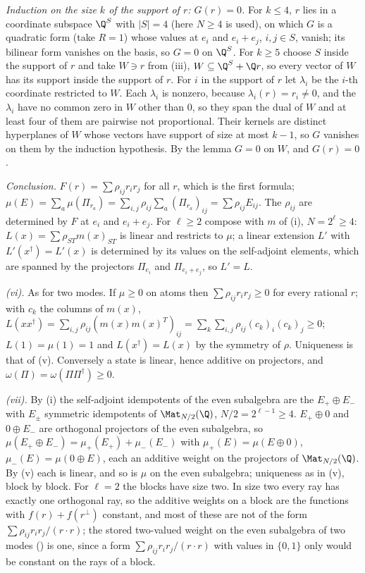 \emph{Induction on the size $k$ of the support of $r$: $G(r) = 0$.} For $k \le 4$, $r$ lies in a coordinate subspace $\Q^{S}$ with $|S| = 4$ (here $N \ge 4$ is used), on which $G$ is a quadratic form (take $R = 1$) whose values at $e_{i}$ and $e_{i} + e_{j}$, $i, j \in S$, vanish; its bilinear form vanishes on the basis, so $G = 0$ on $\Q^{S}$. For $k \ge 5$ choose $S$ inside the support of $r$ and take $W \ni r$ from (iii), $W \subseteq \Q^{S} + \Q r$, so every vector of $W$ has its support inside the support of $r$. For $i$ in the support of $r$ let $\lambda_{i}$ be the $i$-th coordinate restricted to $W$. Each $\lambda_{i}$ is nonzero, because $\lambda_{i}(r) = r_{i} \ne 0$, and the $\lambda_{i}$ have no common zero in $W$ other than $0$, so they span the dual of $W$ and at least four of them are pairwise not proportional. Their kernels are distinct hyperplanes of $W$ whose vectors have support of size at most $k - 1$, so $G$ vanishes on them by the induction hypothesis. By the lemma $G = 0$ on $W$, and $G(r) = 0$.

\emph{Conclusion.} $F(r) = \sum\rho_{ij}r_{i}r_{j}$ for all $r$, which is the first formula; $\mu(E) = \sum_{a}\mu(\Pi_{r_{a}}) = \sum_{i,j}\rho_{ij}\sum_{a}(\Pi_{r_{a}})_{ij} = \sum\rho_{ij}E_{ij}$. The $\rho_{ij}$ are determined by $F$ at $e_{i}$ and $e_{i} + e_{j}$. For $\ell \ge 2$ compose with $m$ of (i), $N = 2^{\ell} \ge 4$: $L(x) = \sum\rho_{ST}m(x)_{ST}$ is linear and restricts to $\mu$; a linear extension $L'$ with $L'(x^{\dagger}) = L'(x)$ is determined by its values on the self-adjoint elements, which are spanned by the projectors $\Pi_{e_{i}}$ and $\Pi_{e_{i} + e_{j}}$, so $L' = L$.

\emph{(vi).} As for two modes. If $\mu \ge 0$ on atoms then $\sum\rho_{ij}r_{i}r_{j} \ge 0$ for every rational $r$; with $c_{k}$ the columns of $m(x)$, $L(xx^{\dagger}) = \sum_{i,j}\rho_{ij}(m(x)m(x)^{T})_{ij} = \sum_{k}\sum_{i,j}\rho_{ij}(c_{k})_{i}(c_{k})_{j} \ge 0$; $L(1) = \mu(1) = 1$ and $L(x^{\dagger}) = L(x)$ by the symmetry of $\rho$. Uniqueness is that of (v). Conversely a state is linear, hence additive on projectors, and $\omega(\Pi) = \omega(\Pi\Pi^{\dagger}) \ge 0$.

\emph{(vii).} By (i) the self-adjoint idempotents of the even subalgebra are the $E_{+} \oplus E_{-}$ with $E_{\pm}$ symmetric idempotents of $\Mat_{N/2}(\Q)$, $N/2 = 2^{\ell-1} \ge 4$. $E_{+} \oplus 0$ and $0 \oplus E_{-}$ are orthogonal projectors of the even subalgebra, so $\mu(E_{+} \oplus E_{-}) = \mu_{+}(E_{+}) + \mu_{-}(E_{-})$ with $\mu_{+}(E) = \mu(E \oplus 0)$, $\mu_{-}(E) = \mu(0 \oplus E)$, each an additive weight on the projectors of $\Mat_{N/2}(\Q)$. By (v) each is linear, and so is $\mu$ on the even subalgebra; uniqueness as in (v), block by block. For $\ell = 2$ the blocks have size two. In size two every ray has exactly one orthogonal ray, so the additive weights on a block are the functions with $f(r) + f(r^{\perp})$ constant, and most of these are not of the form $\sum\rho_{ij}r_{i}r_{j}/(r \cdot r)$; the stored two-valued weight on the even subalgebra of two modes () is one, since a form $\sum\rho_{ij}r_{i}r_{j}/(r \cdot r)$ with values in $\{0, 1\}$ only would be constant on the rays of a block.
